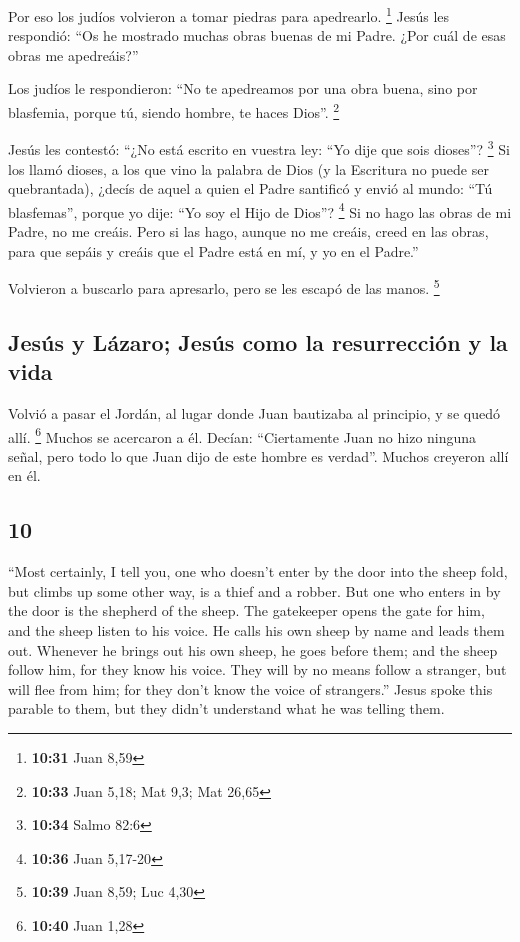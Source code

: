 \begin{paracol}{2}
 Por eso los judíos volvieron a tomar piedras para
apedrearlo. \footnote{\textbf{10:31} Juan 8,59}  Jesús
les respondió: ``Os he mostrado muchas obras buenas de mi Padre. ¿Por
cuál de esas obras me apedreáis?''

 Los judíos le respondieron: ``No te apedreamos por una
obra buena, sino por blasfemia, porque tú, siendo hombre, te haces
Dios''. \footnote{\textbf{10:33} Juan 5,18; Mat 9,3; Mat 26,65}

 Jesús les contestó: ``¿No está escrito en vuestra ley:
``Yo dije que sois dioses''? \footnote{\textbf{10:34} Salmo 82:6}
 Si los llamó dioses, a los que vino la palabra de Dios
(y la Escritura no puede ser quebrantada),  ¿decís de
aquel a quien el Padre santificó y envió al mundo: ``Tú blasfemas'',
porque yo dije: ``Yo soy el Hijo de Dios''? \footnote{\textbf{10:36}
  Juan 5,17-20}  Si no hago las obras de mi Padre, no me
creáis.  Pero si las hago, aunque no me creáis, creed en
las obras, para que sepáis y creáis que el Padre está en mí, y yo en el
Padre.''

 Volvieron a buscarlo para apresarlo, pero se les escapó
de las manos. \footnote{\textbf{10:39} Juan 8,59; Luc 4,30}

\hypertarget{jesuxfas-y-luxe1zaro-jesuxfas-como-la-resurrecciuxf3n-y-la-vida}{%
\subsection{Jesús y Lázaro; Jesús como la resurrección y la
vida}\label{jesuxfas-y-luxe1zaro-jesuxfas-como-la-resurrecciuxf3n-y-la-vida}}

 Volvió a pasar el Jordán, al lugar donde Juan bautizaba
al principio, y se quedó allí. \footnote{\textbf{10:40} Juan 1,28}
 Muchos se acercaron a él. Decían: ``Ciertamente Juan no
hizo ninguna señal, pero todo lo que Juan dijo de este hombre es
verdad''.  Muchos creyeron allí en él.

\switchcolumn
\begin{otherlanguage}{english}

\hypertarget{section-19}{%
\section{10}\label{section-19}}

 ``Most certainly, I tell you, one who doesn't enter by
the door into the sheep fold, but climbs up some other way, is a thief
and a robber.  But one who enters in by the door is the
shepherd of the sheep.  The gatekeeper opens the gate for
him, and the sheep listen to his voice. He calls his own sheep by name
and leads them out.  Whenever he brings out his own sheep,
he goes before them; and the sheep follow him, for they know his voice.
 They will by no means follow a stranger, but will flee
from him; for they don't know the voice of strangers.'' 
Jesus spoke this parable to them, but they didn't understand what he was
telling them.


\end{otherlanguage}
\end{paracol}
